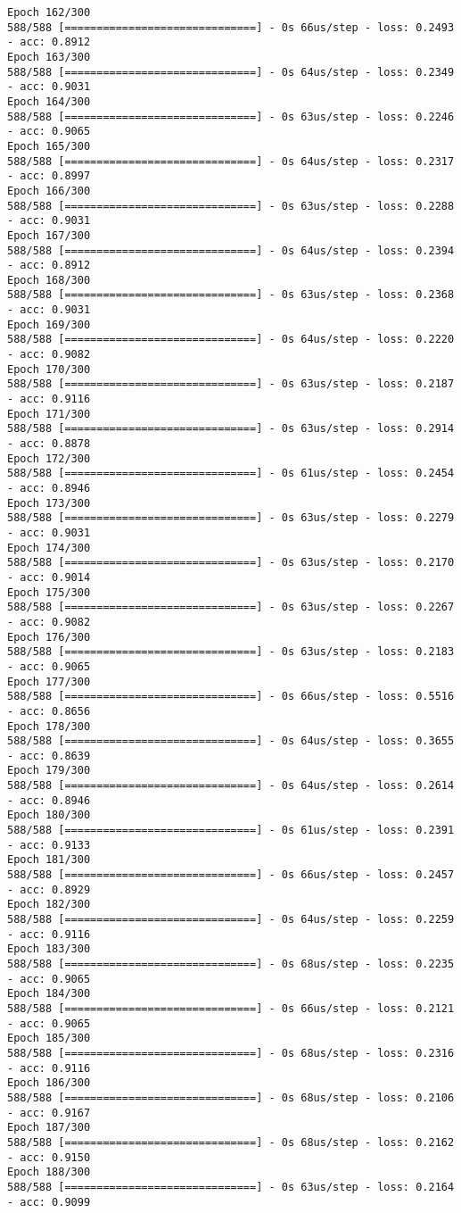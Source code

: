 \documentclass[11pt]{article}
\begin{document}
\begin{Verbatim}[commandchars=\\\{\}]
Epoch 162/300
588/588 [==============================] - 0s 66us/step - loss: 0.2493 - acc: 0.8912
Epoch 163/300
588/588 [==============================] - 0s 64us/step - loss: 0.2349 - acc: 0.9031
Epoch 164/300
588/588 [==============================] - 0s 63us/step - loss: 0.2246 - acc: 0.9065
Epoch 165/300
588/588 [==============================] - 0s 64us/step - loss: 0.2317 - acc: 0.8997
Epoch 166/300
588/588 [==============================] - 0s 63us/step - loss: 0.2288 - acc: 0.9031
Epoch 167/300
588/588 [==============================] - 0s 64us/step - loss: 0.2394 - acc: 0.8912
Epoch 168/300
588/588 [==============================] - 0s 63us/step - loss: 0.2368 - acc: 0.9031
Epoch 169/300
588/588 [==============================] - 0s 64us/step - loss: 0.2220 - acc: 0.9082
Epoch 170/300
588/588 [==============================] - 0s 63us/step - loss: 0.2187 - acc: 0.9116
Epoch 171/300
588/588 [==============================] - 0s 63us/step - loss: 0.2914 - acc: 0.8878
Epoch 172/300
588/588 [==============================] - 0s 61us/step - loss: 0.2454 - acc: 0.8946
Epoch 173/300
588/588 [==============================] - 0s 63us/step - loss: 0.2279 - acc: 0.9031
Epoch 174/300
588/588 [==============================] - 0s 63us/step - loss: 0.2170 - acc: 0.9014
Epoch 175/300
588/588 [==============================] - 0s 63us/step - loss: 0.2267 - acc: 0.9082
Epoch 176/300
588/588 [==============================] - 0s 63us/step - loss: 0.2183 - acc: 0.9065
Epoch 177/300
588/588 [==============================] - 0s 66us/step - loss: 0.5516 - acc: 0.8656
Epoch 178/300
588/588 [==============================] - 0s 64us/step - loss: 0.3655 - acc: 0.8639
Epoch 179/300
588/588 [==============================] - 0s 64us/step - loss: 0.2614 - acc: 0.8946
Epoch 180/300
588/588 [==============================] - 0s 61us/step - loss: 0.2391 - acc: 0.9133
Epoch 181/300
588/588 [==============================] - 0s 66us/step - loss: 0.2457 - acc: 0.8929
Epoch 182/300
588/588 [==============================] - 0s 64us/step - loss: 0.2259 - acc: 0.9116
Epoch 183/300
588/588 [==============================] - 0s 68us/step - loss: 0.2235 - acc: 0.9065
Epoch 184/300
588/588 [==============================] - 0s 66us/step - loss: 0.2121 - acc: 0.9065
Epoch 185/300
588/588 [==============================] - 0s 68us/step - loss: 0.2316 - acc: 0.9116
Epoch 186/300
588/588 [==============================] - 0s 68us/step - loss: 0.2106 - acc: 0.9167
Epoch 187/300
588/588 [==============================] - 0s 68us/step - loss: 0.2162 - acc: 0.9150
Epoch 188/300
588/588 [==============================] - 0s 63us/step - loss: 0.2164 - acc: 0.9099

\end{Verbatim}
\end{document}
